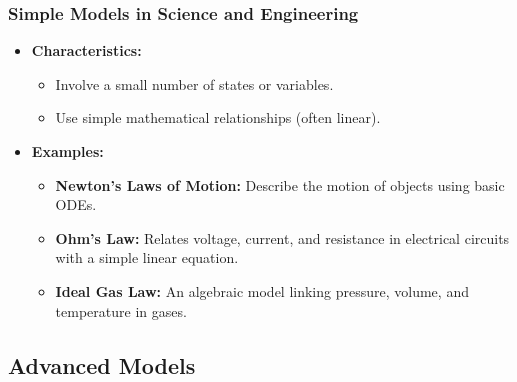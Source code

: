 \documentclass{beamer}
\begin{document}
\begin{frame}
\frametitle{Simple Models in Science and Engineering}
\begin{itemize}
    \item \textbf{Characteristics:} 
    \begin{itemize}
        \item Involve a small number of states or variables.
        \item Use simple mathematical relationships (often linear).
    \end{itemize}
    \item \textbf{Examples:}
    \begin{itemize}
        \item \textbf{Newton's Laws of Motion:} Describe the motion of objects using basic ODEs.
        \item \textbf{Ohm's Law:} Relates voltage, current, and resistance in electrical circuits with a simple linear equation.
        \item \textbf{Ideal Gas Law:} An algebraic model linking pressure, volume, and temperature in gases.
    \end{itemize}
\end{itemize}
\end{frame}

\subsection{Advanced Models}
\end{document}
